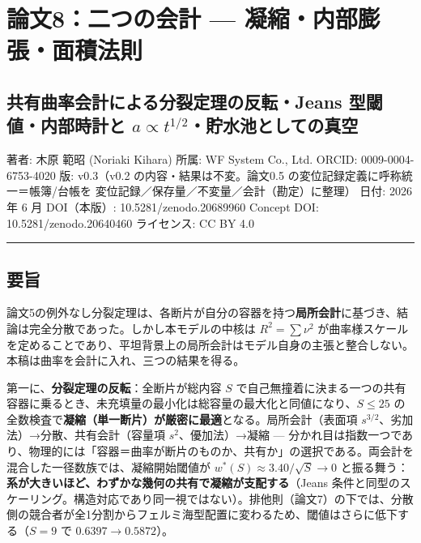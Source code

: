 \documentclass[
]{ltjsarticle}
\author{}
\date{}
\begin{document}
\section{論文8：二つの会計 ---
凝縮・内部膨張・面積法則}\label{ux8ad6ux65878ux4e8cux3064ux306eux4f1aux8a08-ux51ddux7e2eux5185ux90e8ux81a8ux5f35ux9762ux7a4dux6cd5ux5247}

\subsection{\texorpdfstring{共有曲率会計による分裂定理の反転・Jeans
型閾値・内部時計と
\(a\propto t^{1/2}\)・貯水池としての真空}{共有曲率会計による分裂定理の反転・Jeans 型閾値・内部時計と a\textbackslash propto t\^{}\{1/2\}・貯水池としての真空}}\label{ux5171ux6709ux66f2ux7387ux4f1aux8a08ux306bux3088ux308bux5206ux88c2ux5b9aux7406ux306eux53cdux8ee2jeans-ux578bux95beux5024ux5185ux90e8ux6642ux8a08ux3068-apropto-t12ux8cafux6c34ux6c60ux3068ux3057ux3066ux306eux771fux7a7a}

著者: 木原 範昭 (Noriaki Kihara) 所属: WF System Co., Ltd. ORCID:
0009-0004-6753-4020 版: v0.3（v0.2 の内容・結果は不変。論文0.5
の変位記録定義に呼称統一＝帳簿/台帳を
変位記録／保存量／不変量／会計（勘定）に整理） 日付: 2026 年 6 月
DOI（本版）: 10.5281/zenodo.20689960 Concept DOI:
10.5281/zenodo.20640460 ライセンス: CC BY 4.0

\begin{center}\rule{0.5\linewidth}{0.5pt}\end{center}

\subsection{要旨}\label{ux8981ux65e8}

論文5の例外なし分裂定理は、各断片が自分の容器を持つ\textbf{局所会計}に基づき、結論は完全分散であった。しかし本モデルの中核は
\(R^2=\sum\nu^2\)
が曲率様スケールを定めることであり、平坦背景上の局所会計はモデル自身の主張と整合しない。本稿は曲率を会計に入れ、三つの結果を得る。

第一に、\textbf{分裂定理の反転}：全断片が総内容 \(S\)
で自己無撞着に決まる一つの共有容器に乗るとき、未充填量の最小化は総容量の最大化と同値になり、\(S\le25\)
の全数検査で\textbf{凝縮（単一断片）が厳密に最適}となる。局所会計（表面項
\(s^{3/2}\)、劣加法）→分散、共有会計（容量項 \(s^2\)、優加法）→凝縮 ---
分かれ目は指数一つであり、物理的には「容器＝曲率が断片のものか、共有か」の選択である。両会計を混合した一径数族では、凝縮開始閾値が
\(w^*(S)\approx 3.40/\sqrt S\to0\)
と振る舞う：\textbf{系が大きいほど、わずかな幾何の共有で凝縮が支配する}（Jeans
条件と同型のスケーリング。構造対応であり同一視ではない）。排他則（論文7）の下では、分散側の競合者が全1分割からフェルミ海型配置に変わるため、閾値はさらに低下する（\(S=9\)
で \(0.6397\to0.5872\)）。
\end{document}
